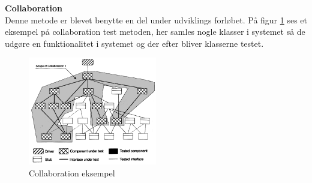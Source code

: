 \textbf{Collaboration}\\
Denne metode er blevet benytte en del under udviklings forløbet. På figur \ref{fig:Collaboration} ses et eksempel på collaboration test metoden, her samles nogle klasser i systemet så de udgøre en funktionalitet i systemet og der efter bliver klasserne testet.

\vspace{-5pt}
\begin{figure}[H]
	\centering
	\includegraphics[width=0.5\textwidth]{Billeder/Test/collaboration.png}
	\vspace{-5pt}
	\caption{Collaboration eksempel}
	\label{fig:Collaboration}
\end{figure}